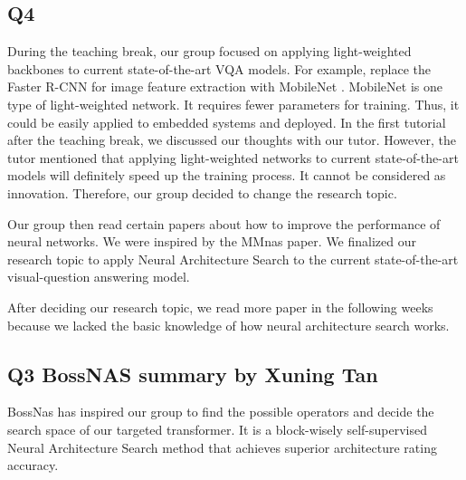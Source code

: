 \documentclass[12pt, a4paper]{article}
\begin{document}
\subsection*{Q4}
\par\noindent \newline During the teaching break, our group focused on applying light-weighted backbones to current state-of-the-art VQA models. For example, replace the Faster R-CNN \cite{DBLP:journals/corr/RenHG015} for image feature extraction with MobileNet \cite{DBLP:journals/corr/HowardZCKWWAA17}. MobileNet \cite{DBLP:journals/corr/HowardZCKWWAA17} is one type of light-weighted network. It requires fewer parameters for training. Thus, it could be easily applied to embedded systems and deployed. In the first tutorial after the teaching break, we discussed our thoughts with our tutor. However, the tutor mentioned that applying light-weighted networks to current state-of-the-art models will definitely speed up the training process. It cannot be considered as innovation. Therefore, our group decided to change the research topic.

\par\noindent \newline Our group then read certain papers about how to improve the performance of neural networks. We were inspired by the MMnas paper. We finalized our research topic to apply Neural Architecture Search to the current state-of-the-art visual-question answering model. 

\par\noindent \newline After deciding our research topic, we read more paper in the following weeks because we lacked the basic knowledge of how neural architecture search works. 

\subsection{Q3 BossNAS summary by Xuning Tan}
BossNas has inspired our group to find the possible operators and decide the search space of our targeted transformer. It is a block-wisely self-supervised Neural Architecture Search method that achieves superior architecture rating accuracy.\\
\end{document}
